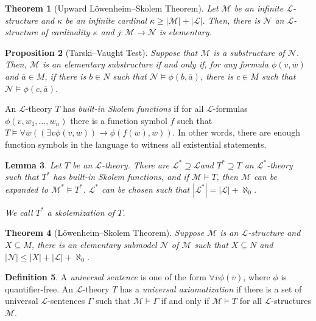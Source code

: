 \documentclass{amsart}
\newtheorem{theorem}{Theorem}[subsection]
\newtheorem{lemma}[theorem]{Lemma}
\newtheorem{proposition}[theorem]{Proposition}
\theoremstyle{definition}
\newtheorem{definition}[theorem]{Definition}
\numberwithin{equation}{section}
\begin{document}
\begin{theorem}[Upward L\"owenheim--Skolem Theorem]
  Let $\mathcal{M}$ be an infinite $\mathcal{L}$-structure and 
  $\kappa$ be an infinite cardinal $\kappa \ge |\mathcal{M}| + |\mathcal{L}|$.
  Then, there is $\mathcal{N}$ an $\mathcal{L}$-structure of cardinality $\kappa$ and $j: \mathcal{M} \to \mathcal{N}$ is elementary.
\end{theorem}

\begin{proposition}[Tarski--Vaught Test]
  Suppose that $\mathcal{M}$ is a substructure of $\mathcal{N}$.
  Then, $\mathcal{M}$ is an elementary substructure if and only if,
  for any formula $\phi(v,\overline{w})$ and $\overline{a} \in M$,
  if there is $b \in N$ such that $\mathcal{N} \models \phi(b,\overline{a})$,
  there is $c \in M$ such that $\mathcal{N} \models \phi(c,\overline{a})$.
\end{proposition}

An $\mathcal{L}$-theory $T$ has \emph{built-in Skolem functions}
if for all $\mathcal{L}$-formulas $\phi(v,w_1,\dots,w_n)$ there is a function symbol $f$
such that $T \models \forall \overline{w} ((\exists v \phi(v,\overline{w})) \to \phi(f(\overline{w}),\overline{w}))$.
In other words, there are enough function symbols in the language to witness all existential statements.

\begin{lemma}
  Let $T$ be an $\mathcal{L}$-theory.
  There are $\mathcal{L}^* \supseteq \mathcal{L}$and $T^* \supseteq T$ an $\mathcal{L}^*$-theory
  such that $T^*$ has built-in Skolem functions,
  and if $\mathcal{M} \models T$,
  then $\mathcal{M}$ can be expanded to $\mathcal{M}^* \models T^*$.
  $\mathcal{L}^*$ can be chosen such that $|\mathcal{L}^*|= |\mathcal{L}|+\aleph_0$.

  We call $T^*$ a skolemization of $T$.
\end{lemma}

\begin{theorem}[L\"owenheim--Skolem Theorem]
  Suppose $\mathcal{M}$ is an $\mathcal{L}$-structure and
  $X \subseteq M$, there is an elementary submodel $\mathcal{N}$ of $\mathcal{M}$
  such that $X \subseteq N$ and $|\mathcal{N}| \le |X| + |\mathcal{L}| + \aleph_0$.
\end{theorem}

\begin{definition}
  A \emph{universal sentence} is one of the form
  $\forall \overline{v} \phi(\overline{v})$,
  where $\phi$ is quantifier-free.
  An $\mathcal{L}$-theory $T$ has a \emph{universal axiomatization} if there is a set of universal $\mathcal{L}$-sentences $\Gamma$
  such that $\mathcal{M} \models \Gamma$ if and only if $\mathcal{M} \models T$ for all $\mathcal{L}$-structures $\mathcal{M}$.
\end{definition}
\end{document}
